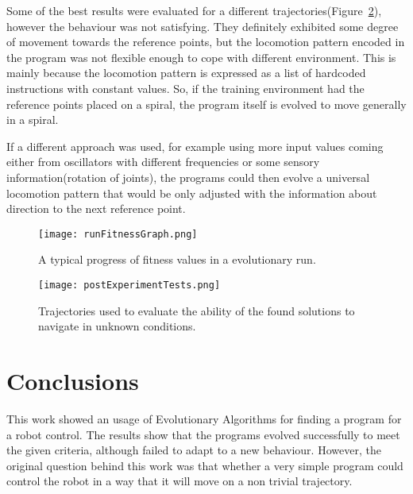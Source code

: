 \documentclass{ExcelAtFIT}
\begin{document}
Some of the best results were evaluated for a different trajectories(Figure~\ref{fig:PostExperimentTests}), however the behaviour was not satisfying.
They definitely exhibited some degree of movement towards the reference points, but the locomotion pattern encoded in the program was not flexible enough to cope with different environment.
This is mainly because the locomotion pattern is expressed as a list of hardcoded instructions with constant values.
So, if the training environment had the reference points placed on a spiral, the program itself is evolved to move generally in a spiral.

If a different approach was used, for example using more input values coming either from oscillators with different frequencies or some sensory information(rotation of joints), the programs could then evolve a universal locomotion pattern that would be only adjusted with the information about direction to the next reference point.

\begin{figure}[t]
	\centering
	{\texttt{[image: runFitnessGraph.png]}}
	\caption{
	A typical progress of fitness values in a evolutionary run.
	}
	\label{fig:FitnessGraph}
\end{figure}

\begin{figure}[t]
	\centering
	{\texttt{[image: postExperimentTests.png]}}
	\caption{
	Trajectories used to evaluate the ability of the found solutions to navigate in unknown conditions.
	}
	\label{fig:PostExperimentTests}
\end{figure}


\section{Conclusions}
\label{sec:Conclusions}

This work showed an usage of Evolutionary Algorithms for finding a program for a robot control.
The results show that the programs evolved successfully to meet the given criteria, although failed to adapt to a new behaviour.
However, the original question behind this work was that whether a very simple program could control the robot in a way that it will move on a non trivial trajectory.
\end{document}
